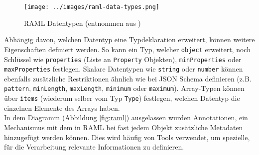 \begin{figure}[H]
  \texttt{[image: ../images/raml-data-types.png]}
  \caption{RAML Datentypen (entnommen aus \cite{ramlspec})}
\end{figure}

Abhängig davon, welchen Datentyp eine Typdeklaration erweitert, können weitere Eigenschaften definiert werden. So kann ein Typ, welcher \lstinline|object| erweitert, noch Schlüssel wie \lstinline|properties| (Liste an \lstinline|Property| Objekten), \lstinline|minProperties| oder \lstinline|maxProperties| festlegen. Skalare Datentypen wie \lstinline|string| oder \lstinline|number| können ebenfalls zusätzliche Restriktionen ähnlich wie bei JSON Schema definieren (z.B. \lstinline|pattern|, \lstinline|minLength|, \lstinline|maxLength|, \lstinline|minimum| oder \lstinline|maximum|). Array-Typen können über \lstinline|items| (wiederum selber vom Typ \lstinline|Type|) festlegen, welchen Datentyp die einzelnen Elemente des Arrays haben. \\

In dem Diagramm (Abbildung \ref{fig:raml}) ausgelassen wurden Annotationen, ein Mechanismus mit dem in RAML bei fast jedem Objekt zusätzliche Metadaten hinzugefügt werden können. Dies wird häufig von Tools verwendet, um spezielle, für die Verarbeitung relevante Informationen zu definieren.